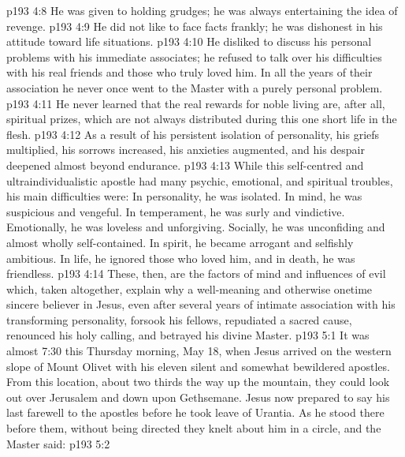 \vs p193 4:8 \bibnobreakspace He was given to holding grudges; he was always entertaining the idea of revenge.
\vs p193 4:9 \bibnobreakspace He did not like to face facts frankly; he was dishonest in his attitude toward life situations.
\vs p193 4:10 \bibnobreakspace He disliked to discuss his personal problems with his immediate associates; he refused to talk over his difficulties with his real friends and those who truly loved him. In all the years of their association he never once went to the Master with a purely personal problem.
\vs p193 4:11 \bibnobreakspace He never learned that the real rewards for noble living are, after all, spiritual prizes, which are not always distributed during this one short life in the flesh.
\vs p193 4:12 \pc As a result of his persistent isolation of personality, his griefs multiplied, his sorrows increased, his anxieties augmented, and his despair deepened almost beyond endurance.
\vs p193 4:13 While this self\hyp{}centred and ultraindividualistic apostle had many psychic, emotional, and spiritual troubles, his main difficulties were: In personality, he was isolated. In mind, he was suspicious and vengeful. In temperament, he was surly and vindictive. Emotionally, he was loveless and unforgiving. Socially, he was unconfiding and almost wholly self\hyp{}contained. In spirit, he became arrogant and selfishly ambitious. In life, he ignored those who loved him, and in death, he was friendless.
\vs p193 4:14 These, then, are the factors of mind and influences of evil which, taken altogether, explain why a well\hyp{}meaning and otherwise onetime sincere believer in Jesus, even after several years of intimate association with his transforming personality, forsook his fellows, repudiated a sacred cause, renounced his holy calling, and betrayed his divine Master.
\vs p193 5:1 It was almost 7:30 this Thursday morning, May 18, when Jesus arrived on the western slope of Mount Olivet with his eleven silent and somewhat bewildered apostles. From this location, about two thirds the way up the mountain, they could look out over Jerusalem and down upon Gethsemane. Jesus now prepared to say his last farewell to the apostles before he took leave of Urantia. As he stood there before them, without being directed they knelt about him in a circle, and the Master said:
\vs p193 5:2 \pc {}
